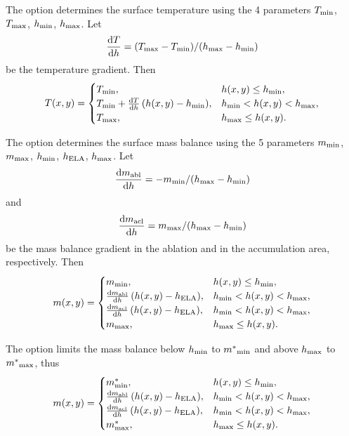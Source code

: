 \documentclass[titlepage,letterpaper,final]{scrartcl}
\begin{document}
The option  determines the surface temperature using the 4 parameters ${T}_{\text{min}}$, ${T}_{\text{max}}$, ${h}_{\text{min}}$, ${h}_{\text{max}}$. Let
\begin{equation}
  \frac{\mathrm{d}T}{\mathrm{d}h} = ({T}_{\text{max}} - {T}_{\text{min}}) / ({h}_{\text{max}} - {h}_{\text{min}})
\end{equation}
be the temperature gradient. Then
\begin{equation}
  T(x,y) =
  \begin{cases}
    {T}_{\text{min}}, & h(x,y) \le {h}_{\text{min}}, \\
    {T}_{\text{min}} + \frac{\mathrm{d}T}{\mathrm{d}h} \, (h(x,y) - {h}_{\text{min}}), & {h}_{\text{min}} < h(x,y) < {h}_{\text{max}}, \\
    {T}_{\text{max}}, & {h}_{\text{max}} \le h(x,y).
  \end{cases}
\end{equation}

The option  determines the surface mass balance using the 5 parameters ${m}_{\text{min}}$, ${m}_{\text{max}}$, ${h}_{\text{min}}$, ${h}_{\text{ELA}}$, ${h}_{\text{max}}$. Let
\begin{equation}
  \frac{\mathrm{d}{m}_{\text{abl}}}{\mathrm{d}h} = -{m}_{\text{min}} / ({h}_{\text{max}} - {h}_{\text{min}})
\end{equation}
and
\begin{equation}
\frac{\mathrm{d}{m}_{\text{acl}}}{\mathrm{d}h} = {m}_{\text{max}} / ({h}_{\text{max}} - {h}_{\text{min}})
\end{equation}
be the mass balance gradient in the ablation and in the accumulation area, respectively.  Then
\begin{equation}
  m(x,y) =
  \begin{cases}
   {m}_{\text{min}}, & h(x,y) \le {h}_{\text{min}}, \\
   \frac{\mathrm{d}{m}_{\text{abl}}}{\mathrm{d}h} \, (h(x,y) - h_{\text{ELA}}), &  {h}_{\text{min}} < h(x,y) < {h}_{\text{max}}, \\
   \frac{\mathrm{d}{m}_{\text{acl}}}{\mathrm{d}h} \, (h(x,y) - h_{\text{ELA}}), & {h}_{\text{min}} < h(x,y) < {h}_{\text{max}}, \\
   {m}_{\text{max}}, & {h}_{\text{max}} \le h(x,y).
 \end{cases}
\end{equation}

The option  limits the mass balance below ${h}_{\text{min}}$ to ${m^{*}}_{\text{min}}$ and above ${h}_{\text{max}}$ to ${m^{*}}_{\text{max}}$, thus
\begin{equation}
  m(x,y) =
  \begin{cases}
    m^{*}_{\text{min}}, & h(x,y) \le {h}_{\text{min}}, \\
    \frac{\mathrm{d}{m}_{\text{abl}}}{\mathrm{d}h} \, (h(x,y) - h_{\text{ELA}}), & {h}_{\text{min}} < h(x,y) < {h}_{\text{max}}, \\
    \frac{\mathrm{d}{m}_{\text{acl}}}{\mathrm{d}h} \, (h(x,y) - h_{\text{ELA}}), & {h}_{\text{min}} < h(x,y) < {h}_{\text{max}}, \\
    m^{*}_{\text{max}}, & {h}_{\text{max}} \le h(x,y).
  \end{cases}
\end{equation}
\end{document}
